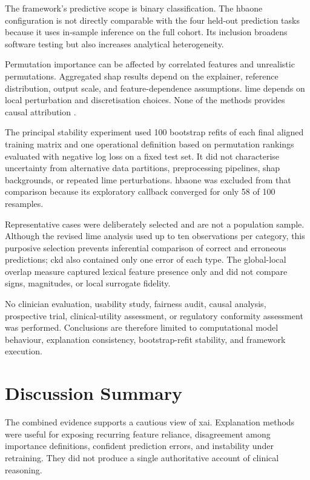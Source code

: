 The framework's predictive scope is binary classification. The \gls{hbaone} configuration is not directly comparable with the four held-out prediction tasks because it uses in-sample inference on the full cohort. Its inclusion broadens software testing but also increases analytical heterogeneity.

Permutation importance can be affected by correlated features and unrealistic permutations. Aggregated \gls{shap} results depend on the explainer, reference distribution, output scale, and feature-dependence assumptions. \gls{lime} depends on local perturbation and discretisation choices. None of the methods provides causal attribution \citep{NIPS2017_8a20a862, ribeiro_why_2016, vilone_classification_2021}.

The principal stability experiment used 100 bootstrap refits of each final aligned training matrix and one operational definition based on permutation rankings evaluated with negative log loss on a fixed test set. It did not characterise uncertainty from alternative data partitions, preprocessing pipelines, \gls{shap} backgrounds, or repeated \gls{lime} perturbations. \gls{hbaone} was excluded from that comparison because its exploratory callback converged for only 58 of 100 resamples.

Representative cases were deliberately selected and are not a population sample. Although the revised \gls{lime} analysis used up to ten observations per category, this purposive selection prevents inferential comparison of correct and erroneous predictions; \gls{ckd} also contained only one error of each type. The global-local overlap measure captured lexical feature presence only and did not compare signs, magnitudes, or local surrogate fidelity.

No clinician evaluation, usability study, fairness audit, causal analysis, prospective trial, clinical-utility assessment, or regulatory conformity assessment was performed. Conclusions are therefore limited to computational model behaviour, explanation consistency, bootstrap-refit stability, and framework execution.

\section{Discussion Summary}

The combined evidence supports a cautious view of \gls{xai}. Explanation methods were useful for exposing recurring feature reliance, disagreement among importance definitions, confident prediction errors, and instability under retraining. They did not produce a single authoritative account of clinical reasoning.


